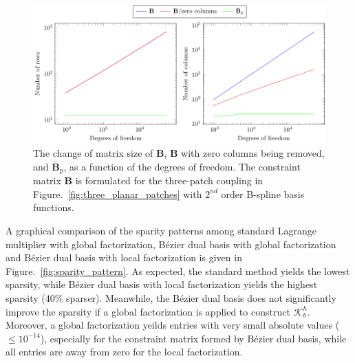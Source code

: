 \documentclass[preprint,12pt]{elsarticle}
\newcommand{\Bezier}{{B\'{e}zier} }
\begin{document}
\begin{figure}[hbt]
	\centering
    \includegraphics[width=\linewidth]{size_vs_dof}
	\caption{The change of matrix size of $\mathbf{B}$, $\mathbf{B}$ with zero columns being removed, and $\bar{\mathbf{B}}_p$, as a function of the degrees of freedom. The constraint matrix $\mathbf{B}$ is formulated for the three-patch coupling in Figure.~\ref{fig:three_planar_patches} with $2^{nd}$ order B-spline basis functions.}\label{fig:size_evolution}
\end{figure}

A graphical comparison of the sparity patterns among standard Lagrange multiplier with global factorization, \Bezier dual basis with global factorization and \Bezier dual basis with local factorization is given in Figure.~\ref{fig:sparity_pattern}. As expected, the standard method yields the lowest sparsity, while \Bezier dual basis with local factorization yields the highest sparsity ($40\%$ sparser). Meanwhile, the \Bezier dual basis does not significantly improve the sparsity if a global factorization is applied to construct $\mathcal{K}_b^h$. Moreover, a global factorization yeilds entries with very small absolute values ($\leq{}10^{-14}$), especially for the constraint matrix formed by \Bezier dual basis, while all entries are away from zero for the local factorization. 
\end{document}
